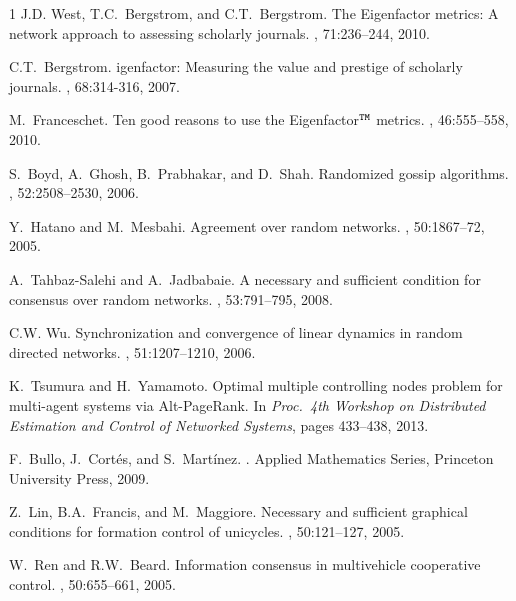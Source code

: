 \documentclass[11pt,draftcls,onecolumn]{IEEEtran}
\begin{document}
\begin{thebibliography}{1}
J.{\;}D. West, T.{\;}C.~Bergstrom, and C.{\;}T.~Bergstrom.
\newblock The {E}igenfactor metrics:  {A} network approach to assessing scholarly journals.
, 71:236--244, 2010.

C.{\;}T.~Bergstrom.
igenfactor:  {M}easuring the value and prestige of scholarly journals.
, 68:314-­316, 2007.

M.~Franceschet.
\newblock Ten good reasons to use the Eigenfactor$^{\tt TM}$ metrics.
, 46:555--558, 2010.

S.~Boyd, A.~Ghosh, B.~Prabhakar, and D.~Shah.
\newblock Randomized gossip algorithms.
, 52:2508--2530, 2006.

Y.~Hatano and M.~Mesbahi.
\newblock Agreement over random networks.
, 50:1867--72, 2005.

A.~Tahbaz-Salehi and A.~Jadbabaie.
\newblock A necessary and sufficient condition for consensus over random
  networks.
, 53:791--795, 2008.

C.{\;}W. Wu.
\newblock Synchronization and convergence of linear dynamics in random directed
  networks.
, 51:1207--1210, 2006.

K.~Tsumura and H.~Yamamoto.
\newblock Optimal multiple controlling nodes problem 
for multi-agent systems via Alt-PageRank.
\newblock In {\em Proc.\ {\rm 4}th Workshop on Distributed Estimation and 
Control of Networked Systems}, pages 433--438, 2013.



F.~Bullo, J.~Cort\'{e}s, and S.\ Mart\'{i}nez.
.
\newblock Applied Mathematics Series,
Princeton University Press, 2009.

Z.~Lin, B.{\;}A.~Francis, and M.~Maggiore. 
\newblock Necessary and sufficient graphical conditions for formation control 
of unicycles. 
, 50:121--127, 2005.

W.~Ren and R.{\;}W.~Beard. 
\newblock Information consensus in multivehicle cooperative control. 
, 50:655--661, 2005.



\end{thebibliography}
\end{document}
